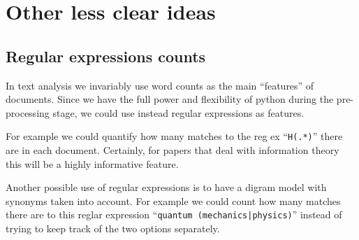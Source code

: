 \documentclass[letterpaper,12pt]{article}
\begin{document}
\section{Other less clear ideas}


	\subsection{Regular expressions counts}
        
        In text analysis we invariably use word counts as the main ``features'' of documents.
        Since we have the full power and flexibility of python during the pre-processing stage,
        we could use instead regular expressions as features.

        For example we could quantify how many matches to the reg ex ``\texttt{H(.*)}'' there are
        in each document. Certainly, for papers that deal with information theory this will be 
        a highly informative feature.

        Another possible use of regular expressions is to have a digram model with synonyms
        taken into account. For example we could count how many matches there are to this
        reglar expression ``\texttt{quantum (mechanics|physics)}'' instead of trying to keep
        track of the two options separately.
		
\end{document}
